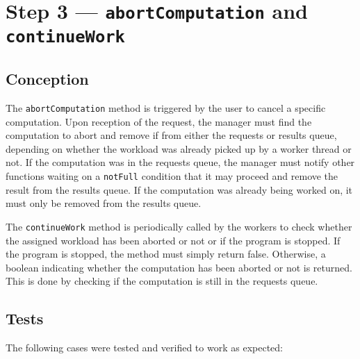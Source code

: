 \documentclass{article}
\begin{document}
    \section*{Step 3 --- \texttt{abortComputation} and \texttt{continueWork}}

    \subsection*{Conception}

    The \texttt{abortComputation} method is triggered by the user to cancel a specific computation.
    Upon reception of the request, the manager must find the computation to abort and remove if from either the requests or results queue, depending
    on whether the workload was already picked up by a worker thread or not.
    If the computation was in the requests queue, the manager must notify other functions waiting on a \texttt{notFull} condition that it may proceed and remove the result from the results queue.
    If the computation was already being worked on, it must only be removed from the results queue.

    The \texttt{continueWork} method is periodically called by the workers to check whether the assigned workload has been aborted or not or if the program is stopped.
    If the program is stopped, the method must simply return false.
    Otherwise, a boolean indicating whether the computation has been aborted or not is returned.
    This is done by checking if the computation is still in the requests queue.

    \subsection*{Tests}

    The following cases were tested and verified to work as expected:
\end{document}
